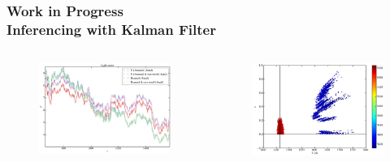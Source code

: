 \documentclass[hyperref={pdfpagelabels=false}]{beamer}
\begin{document}
\begin{frame}
\frametitle{Work in Progress\\Inferencing with Kalman Filter}
\begin{columns}
\centering
  \begin{column}{0.5\textwidth}
    \begin{figure}
      \includegraphics[scale=0.12]{images/all_LCs_detail.jpg}
    \end{figure}
  \end{column}
  \begin{column}{0.5\textwidth}
      \begin{figure}
        \includegraphics[scale=0.12]{images/T_vs_e.jpg}
      \end{figure}
  \end{column}
\end{columns}

\end{frame}
\end{document}
